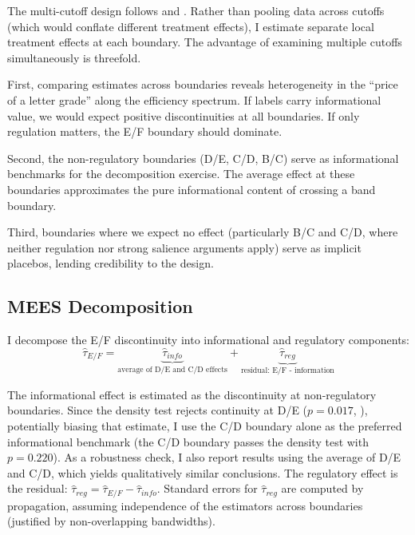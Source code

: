 \documentclass[12pt]{article}
\begin{document}
The multi-cutoff design follows \citet{cattaneo2016interpreting} and \citet{cattaneo2021rdmulti}. Rather than pooling data across cutoffs (which would conflate different treatment effects), I estimate separate local treatment effects at each boundary. The advantage of examining multiple cutoffs simultaneously is threefold.

First, comparing estimates across boundaries reveals heterogeneity in the ``price of a letter grade'' along the efficiency spectrum. If labels carry informational value, we would expect positive discontinuities at all boundaries. If only regulation matters, the E/F boundary should dominate.

Second, the non-regulatory boundaries (D/E, C/D, B/C) serve as informational benchmarks for the decomposition exercise. The average effect at these boundaries approximates the pure informational content of crossing a band boundary.

Third, boundaries where we expect no effect (particularly B/C and C/D, where neither regulation nor strong salience arguments apply) serve as implicit placebos, lending credibility to the design.

\subsection{MEES Decomposition}

I decompose the E/F discontinuity into informational and regulatory components:
\begin{equation}
\hat{\tau}_{E/F} = \underbrace{\hat{\tau}_{info}}_{\text{average of D/E and C/D effects}} + \underbrace{\hat{\tau}_{reg}}_{\text{residual: E/F - information}}
\end{equation}

The informational effect is estimated as the discontinuity at non-regulatory boundaries. Since the density test rejects continuity at D/E ($p = 0.017$, ), potentially biasing that estimate, I use the C/D boundary alone as the preferred informational benchmark (the C/D boundary passes the density test with $p = 0.220$). As a robustness check, I also report results using the average of D/E and C/D, which yields qualitatively similar conclusions. The regulatory effect is the residual: $\hat{\tau}_{reg} = \hat{\tau}_{E/F} - \hat{\tau}_{info}$. Standard errors for $\hat{\tau}_{reg}$ are computed by propagation, assuming independence of the estimators across boundaries (justified by non-overlapping bandwidths).
\end{document}
